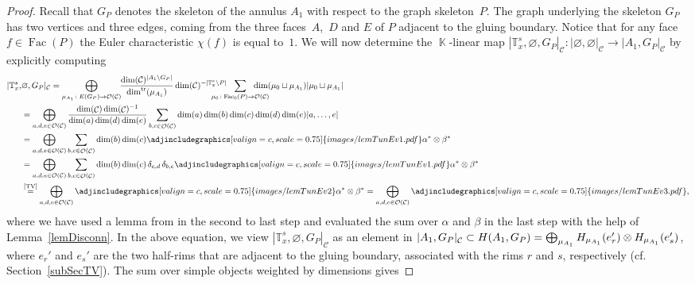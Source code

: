\documentclass[pdftex]{sigma}
\DeclareMathOperator{\tr}{tr}
\DeclareMathOperator{\K}{\mathbb{K}}
\DeclareMathOperator{\calc}{\mathcal{C}}
\DeclareMathOperator{\calo}{\mathcal{O}}
\DeclareMathOperator{\Fac}{\mathrm{Fac}}
\numberwithin{equation}{section}
\theoremstyle{definition}
\begin{document}
\begin{proof}
 Recall that $G_P$ denotes the skeleton of the annulus $A_1$ with respect to the graph skeleton~$P$. The graph underlying the skeleton $G_P$ has two vertices and three edges, coming from the three faces~$A$,~$D$ and $E$ of $P$ adjacent to the gluing boundary. Notice that for any face $f \in \Fac(P)$ the Euler characteristic $\chi(f)$ is equal to~$1$. We will now determine the $\K$-linear map $|\mathbb{T}_x^s, \varnothing, G_P|_{\mathcal{C}}\colon |\varnothing, \varnothing|_{\calc} \rightarrow |A_1, G_P|_{\calc}$ by explicitly computing
 \begin{align}
 \label{eqGenTunPrep}
 |\mathbb{T}_x^s, &\varnothing, G_P|_{\mathcal{C}} = \bigoplus_{\mu_{A_1} \colon E(G_P) \rightarrow \mathcal{O}(\mathcal{C})}\!\!\frac{\dim(\mathcal{C})^{|A_1\setminus G_P|}}{\dim^{\tr}(\mu_{A_1})}\dim(\mathcal{C})^{-|\mathbb{T}_x^s\setminus P|} \!\!\! \!\!\!\!\!\!\!\!\! \sum_{\mu_0\colon \mathrm{Fac}_{0}(P) \rightarrow \mathcal{O}(\mathcal{C})} \!\!\!\!\!\! \!\!\! \!\!\!\dim(\mu_0 \sqcup \mu_{A_1})|\mu_0 \sqcup \mu_{A_1}| \nonumber \\
 &= \bigoplus_{a, d, e \in \mathcal{O}(\mathcal{C})} \frac{\dim(\calc)\dim(\calc)^{-1}}{\dim(a) \dim(d) \dim(e)} \sum_{b, c \in \calo(\calc)} \dim(a)\dim(b)\dim(c)\dim(d)\dim(e) |a, \dots, e| \nonumber \\
 &= \bigoplus_{a, d, e \in \mathcal{O}(\mathcal{C})}\sum_{b, c \in \calo(\calc)} \dim(b) \dim(c) \adjincludegraphics[valign=c, scale = 0.75]{images/lemTunEv1.pdf} \alpha^* \otimes \beta^* \nonumber \\
 &= \bigoplus_{a, d, e \in \mathcal{O}(\mathcal{C})}\sum_{b, c \in \calo(\calc)} \dim(b) \dim(c) \, \delta_{c,d} \, \delta_{b,e} \adjincludegraphics[valign=c, scale = 0.75]{images/lemTunEv1.pdf}\alpha^* \otimes \beta^* \nonumber \\
 &\overset{\text{\cite[Lemma 12.3]{TV}}}{=} \bigoplus_{a, d, e \in \mathcal{O}(\mathcal{C})} \adjincludegraphics[valign=c, scale = 0.75]{images/lemTunEv2}\alpha^* \otimes \beta^* = \bigoplus_{a, d, e \in \mathcal{O}(\mathcal{C})} \adjincludegraphics[valign=c, scale = 0.75]{images/lemTunEv3.pdf},
 \end{align}
 where we have used a lemma from \cite{TV} in the second to last step and evaluated the sum over $\alpha$ and $\beta$ in the last step with the help of Lemma~\ref{lemDisconn}. In the above equation, we view $|\mathbb{T}_x^s, \varnothing, G_P|_{\mathcal{C}}$ as an element in $|A_1, G_P|_{\calc} \subset H(A_1, G_P) = \smash{\bigoplus_{\mu_{A_1}}H_{\mu_{A_1}}(e_r') \otimes H_{\mu_{A_1}}(e_s')}$, where $e_r'$ and $e_s'$ are the two half-rims that are adjacent to the gluing boundary, associated with the rims $r$ and $s$, respectively (cf. Section~\ref{subSecTV}). The sum over simple objects weighted by dimensions gives

\end{proof}
\end{document}
